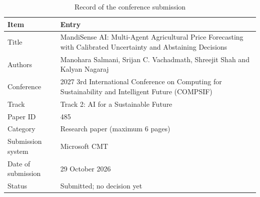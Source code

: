 \begin{table}[H]
\centering
\caption{Record of the conference submission}
\label{tab:paper}
\small
\begin{tabular}{|l|p{9.2cm}|}
\hline
\textbf{Item} & \textbf{Entry} \\ \hline
Title & MandiSense AI: Multi-Agent Agricultural Price Forecasting with Calibrated Uncertainty and Abstaining Decisions \\ \hline
Authors & Manohara Salmani, Srijan C. Vachadmath, Shreejit Shah and Kalyan Nagaraj \\ \hline
Conference & 2027 3rd International Conference on Computing for Sustainability and Intelligent Future (COMPSIF) \\ \hline
Track & Track 2: AI for a Sustainable Future \\ \hline
Paper ID & 485 \\ \hline
Category & Research paper (maximum 6 pages) \\ \hline
Submission system & Microsoft CMT \\ \hline
Date of submission & 29 October 2026 \\ \hline
Status & Submitted; no decision yet \\ \hline
\end{tabular}
\end{table}

